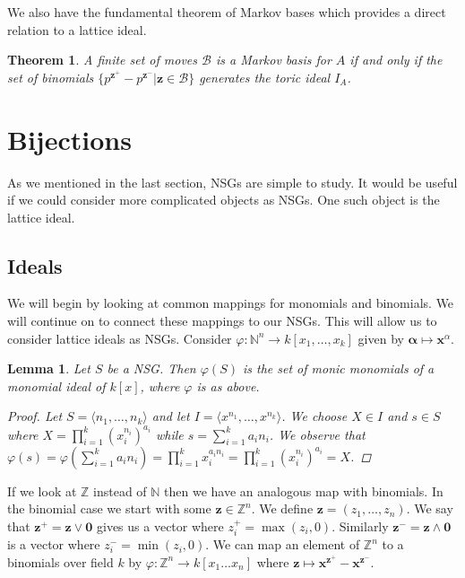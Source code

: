 \documentclass[11pt]{amsart}
\theoremstyle{plain}
\newtheorem{thm}{Theorem}
\newtheorem{lemma}{Lemma}
\theoremstyle{definition}
\begin{document}
We also have the fundamental theorem of Markov bases which provides a direct relation
to a lattice ideal.
\begin{thm}
\cite[p.~54]{aoki}
A finite set of moves $\mathcal{B}$ is a Markov basis for $A$ if and only if the set of binomials $\{p^{\mathbf{z}^+}-p^{\mathbf{z}^-}|\mathbf{z}\in \mathcal{B}\}$ generates the toric ideal $I_A$.
\end{thm}

\section{Bijections}
As we mentioned in the last section, NSGs are simple to study.
It would be useful if we could consider more complicated objects as NSGs.
One such object is the lattice ideal.
\subsection{Ideals}
We will begin by looking at common mappings for monomials and binomials. We will continue on to connect these mappings to our NSGs. This will allow us to consider lattice ideals as NSGs.
Consider
$\varphi:\mathbb{N}^n\to k[x_1,\dots,x_k]$ given by $\mathbf{\alpha}\mapsto
\mathbf{x}^\alpha$.

\begin{lemma}
Let $S$ be a NSG.  Then $\varphi(S)$ is the set of monic
monomials of a monomial ideal of $k[x]$, where $\varphi$ is as above.
\begin{proof}
  Let $S=\langle n_1,\dots,n_k\rangle$ and let $I=\langle x^{n_1},\dots,x^{n_k}\rangle$.
  We choose $X\in I$ and $s\in S$ where
  $X=\prod\limits_{i=1}^k{\left(x_i^{n_i}\right)^{a_i}}$ while
  $s=\sum\limits_{i=1}^k{a_in_i}$.
  We observe that $\varphi(s)=\varphi(\sum\limits_{i=1}^k{a_in_i})=\prod\limits_{i=1}^k{x_i^{a_in_i}}=\prod\limits_{i=1}^k{\left(x_i^{n_i}\right)^{a_i}}=X$.
\end{proof}
\end{lemma}

If we look at $\mathbb{Z}$ instead of $\mathbb{N}$ then we have an analogous map with binomials. In the binomial case we start with some $\mathbf{z}\in \mathbb{Z}^n$.
We define $\mathbf{z}=(z_1,\dots,z_n)$.
We say that $\mathbf{z}^+=\mathbf{z}\vee\mathbf{0}$
gives us a vector where $z_i^+=\max(z_i,0)$. Similarly
$\mathbf{z^-}=\mathbf{z}\wedge \mathbf{0}$ is a vector where $z_i^-=\min(z_i,0)$.
We can map an element of $\mathbb{Z}^n$ to a binomials over field $k$ by $\varphi:\mathbb{Z}^n\to k[x_1\dots x_n]$ where $\mathbf{z}\mapsto
\mathbf{x}^{\mathbf{z}^+}-\mathbf{x}^{\mathbf{z}^-}$.
\end{document}
